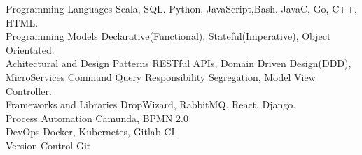

\begin{cvskills}
  \cvskill
    {Programming Languages} %
    {  Scala, SQL.} 
  \cvskill
    {} %
    {  Python, JavaScript,Bash. } 
  \cvskill
    {} %
    {  JavaC, Go, C++, HTML.} 
  \\
  \cvskill
    {Programming Models} %
    { Declarative(Functional), Stateful(Imperative), Object Orientated.} 
  \\
  \cvskill
    {Achitectural and Design Patterns} %
    {  RESTful APIs, Domain Driven Design(DDD), MicroServices}
    \cvskill
    {} %
    {  Command Query Responsibility Segregation, Model View Controller.} 
  \\
  \cvskill
    {Frameworks and Libraries} %
    {  DropWizard, RabbitMQ.} 
  \cvskill
    {} %
    {  React, Django.} 
  \\
  \cvskill
    {Process Automation}
    { Camunda, BPMN 2.0}
  \\
  \cvskill
    {DevOps} %
    { Docker, Kubernetes, Gitlab CI} %
  \\
  \cvskill
  {Version Control} %
  { Git} %

\end{cvskills}
